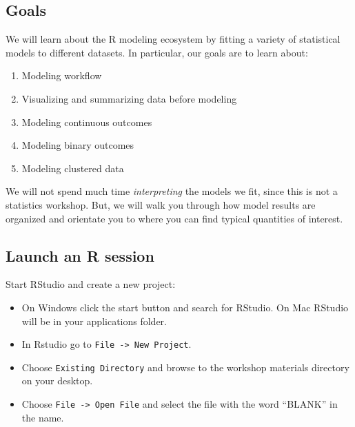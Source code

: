\documentclass[
]{book}
\providecommand{\tightlist}{%
  \setlength{\itemsep}{0pt}\setlength{\parskip}{0pt}}
\begin{document}
\hypertarget{goals-1}{%
\subsection{Goals}\label{goals-1}}

\begin{alert}

We will learn about the R modeling ecosystem by fitting a variety of statistical models to
different datasets. In particular, our goals are to learn about:

\begin{enumerate}
\def\labelenumi{\arabic{enumi}.}
\tightlist
\item
  Modeling workflow
\item
  Visualizing and summarizing data before modeling
\item
  Modeling continuous outcomes
\item
  Modeling binary outcomes
\item
  Modeling clustered data
\end{enumerate}

We will not spend much time \emph{interpreting} the models we fit, since this is not a statistics workshop.
But, we will walk you through how model results are organized and orientate you to where you can find
typical quantities of interest.

\end{alert}

\hypertarget{launch-an-r-session}{%
\subsection{Launch an R session}\label{launch-an-r-session}}

Start RStudio and create a new project:

\begin{itemize}
\tightlist
\item
  On Windows click the start button and search for RStudio. On Mac
  RStudio will be in your applications folder.
\item
  In Rstudio go to \texttt{File\ -\textgreater{}\ New\ Project}.
\item
  Choose \texttt{Existing\ Directory} and browse to the workshop materials directory on your desktop.
\item
  Choose \texttt{File\ -\textgreater{}\ Open\ File} and select the file with the word ``BLANK'' in the name.
\end{itemize}
\end{document}
